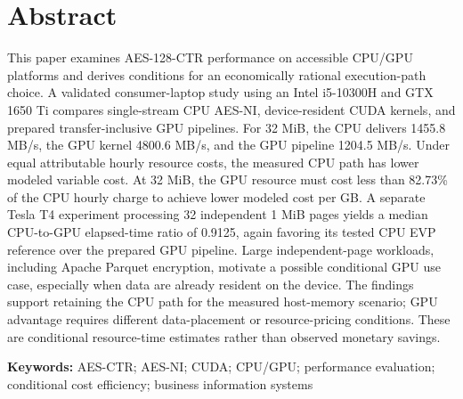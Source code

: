 \documentclass[11pt,b5paper]{article}
\begin{document}
\section*{Abstract}
This paper examines AES-128-CTR performance on accessible CPU/GPU platforms and derives conditions for an economically rational execution-path choice. A validated consumer-laptop study using an Intel i5-10300H and GTX 1650 Ti compares single-stream CPU AES-NI, device-resident CUDA kernels, and prepared transfer-inclusive GPU pipelines. For 32 MiB, the CPU delivers 1455.8 MB/s, the GPU kernel 4800.6 MB/s, and the GPU pipeline 1204.5 MB/s. Under equal attributable hourly resource costs, the measured CPU path has lower modeled variable cost. At 32 MiB, the GPU resource must cost less than 82.73\% of the CPU hourly charge to achieve lower modeled cost per GB. A separate Tesla T4 experiment processing 32 independent 1 MiB pages yields a median CPU-to-GPU elapsed-time ratio of 0.9125, again favoring its tested CPU EVP reference over the prepared GPU pipeline. Large independent-page workloads, including Apache Parquet encryption, motivate a possible conditional GPU use case, especially when data are already resident on the device. The findings support retaining the CPU path for the measured host-memory scenario; GPU advantage requires different data-placement or resource-pricing conditions. These are conditional resource-time estimates rather than observed monetary savings.

\noindent\textbf{Keywords:} AES-CTR; AES-NI; CUDA; CPU/GPU; performance evaluation; conditional cost efficiency; business information systems
\end{document}
